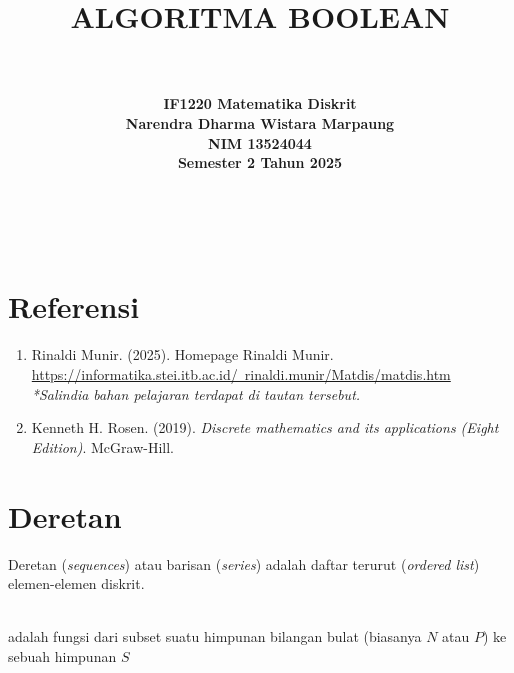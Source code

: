 \documentclass[11pt]{article}
\title {
        \Huge{\bfseries{ALGORITMA BOOLEAN}} \\
    }
\author {
        \rule{12.5cm}{0.5pt} \\[3pt]
        \bfseries{IF1220 Matematika Diskrit}\\[3pt]
        Narendra Dharma Wistara Marpaung \\[3pt]
        NIM 13524044 \\[3pt]
        Semester 2 Tahun 2025 \\[3pt]
        \rule{12.5cm}{0.5pt} \\[1.5pt]
    }
\date{}
\theoremstyle{definitionstyle}
\theoremstyle{theoremstyle}
\theoremstyle{examplestyle}
\begin{document}
    \maketitle
    \thispagestyle{empty}
    \tableofcontents
    \pagebreak
    \section*{Referensi}
    \begin{enumerate}[left=0pt, itemsep=1.5pt, topsep=1.5pt]
        \item Rinaldi Munir. (2025). Homepage Rinaldi Munir. \href{https://informatika.stei.itb.ac.id/~rinaldi.munir/Matdis/matdis.htm}{https://informatika.stei.itb.ac.id/~rinaldi.munir/Matdis/matdis.htm} \\
        \textit{*Salindia bahan pelajaran terdapat di tautan tersebut.}
        \item Kenneth H. Rosen. (2019). \textit{Discrete mathematics and its applications (Eight Edition)}. McGraw-Hill.
    \end{enumerate}

    \pagebreak

    \setcounter{page}{1}
    \section{Deretan}
    Deretan (\textit{sequences}) atau barisan (\textit{series}) adalah daftar terurut (\textit{ordered list}) elemen-elemen diskrit.
    \begin{definition}\hfill \\
        adalah fungsi dari subset suatu himpunan bilangan bulat (biasanya $N$ atau $P$) ke sebuah himpunan $S$
    \end{definition}
    
\end{document}

